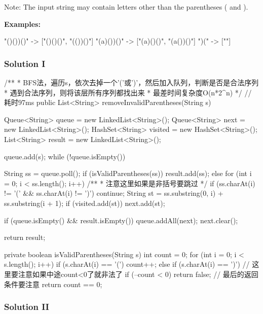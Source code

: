 Note: The input string may contain letters other than the parentheses ( and ).

\textbf{Examples:}
\begin{Code}
"()())()" -> ["()()()", "(())()"]
"(a)())()" -> ["(a)()()", "(a())()"]
")(" -> [""]
\end{Code}

\newpage

\subsubsection{Solution I}

\begin{Code}
/**
 * BFS法，遍历s，依次去掉一个'('或')'，然后加入队列，判断是否是合法序列
 * 遇到合法序列，则将该层所有序列都找出来
 * 最差时间复杂度O(n*2^n)
 */
// 耗时97ms
public List<String> removeInvalidParentheses(String s) {
    Queue<String> queue = new LinkedList<String>();
    Queue<String> next = new LinkedList<String>();
    HashSet<String> visited = new HashSet<String>();
    List<String> result = new LinkedList<String>();

    queue.add(s);
    while (!queue.isEmpty()) {
        String ss = queue.poll();
        if (isValidParentheses(ss)) {
            result.add(ss);
        } else {
            for (int i = 0; i < ss.length(); i++) {
                /**
                 * 注意这里如果是非括号要跳过
                 */
                if (ss.charAt(i) != '(' && ss.charAt(i) != ')') {
                    continue;
                }
                String st = ss.substring(0, i) + ss.substring(i + 1);
                if (visited.add(st)) {
                    next.add(st);
                }
            }
        }

        if (queue.isEmpty() && result.isEmpty()) {
            queue.addAll(next);
            next.clear();
        }
    }

    return result;
}

private boolean isValidParentheses(String s) {
    int count = 0;
    for (int i = 0; i < s.length(); i++) {
        if (s.charAt(i) == '(') {
            count++;
        } else if (s.charAt(i) == ')') {
            // 这里要注意如果中途count<0了就非法了
            if (--count < 0) {
                return false;
            }
        }
    }
    // 最后的返回条件要注意
    return count == 0;
}
\end{Code}

\newpage

\subsubsection{Solution II}

